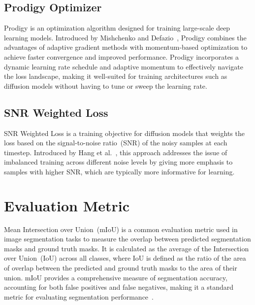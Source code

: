 \subsection{Prodigy Optimizer}
\label{subsec:prodigy_optimizer}

Prodigy is an optimization algorithm designed for training large-scale deep learning models. Introduced by Mishchenko and Defazio~\cite{mishchenko2023prodigy}, Prodigy combines the advantages of adaptive gradient methods with momentum-based optimization to achieve faster convergence and improved performance. Prodigy incorporates a dynamic learning rate schedule and adaptive momentum to effectively navigate the loss landscape, making it well-suited for training architectures such as diffusion models without having to tune or sweep the learning rate.

\subsection{SNR Weighted Loss}
\label{subsec:snr_weighted_loss}

SNR Weighted Loss is a training objective for diffusion models that weights the loss based on the signal-to-noise ratio~(SNR) of the noisy samples at each timestep. Introduced by Hang et al.~\cite{hang2024efficientdiffusiontrainingminsnr}, this approach addresses the issue of imbalanced training across different noise levels by giving more emphasis to samples with higher SNR, which are typically more informative for learning.

\section{Evaluation Metric}
\label{sec:evaluation_metric}

Mean Intersection over Union~(mIoU) is a common evaluation metric used in image segmentation tasks to measure the overlap between predicted segmentation masks and ground truth masks. It is calculated as the average of the Intersection over Union~(IoU) across all classes, where IoU is defined as the ratio of the area of overlap between the predicted and ground truth masks to the area of their union. mIoU provides a comprehensive measure of segmentation accuracy, accounting for both false positives and false negatives, making it a standard metric for evaluating segmentation performance~\cite{long2015fully}.
